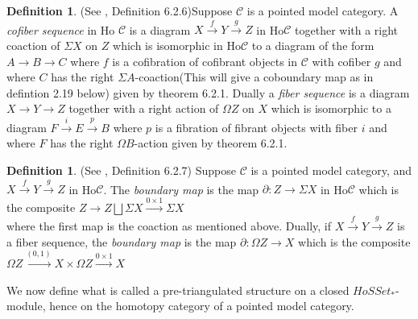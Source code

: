 \documentclass{article}
\newcommand{\cC}{\mathcal{C}}
\theoremstyle{definition}
\newtheorem{definition}[theorem]{Definition}
\theoremstyle{remark}
\begin{document}
\begin{definition}
    (See \cite{MR1650134}, Definition 6.2.6)\label{def:cofseq} Suppose $\cC$ is a pointed model category. A \textit{cofiber sequence} in Ho $\cC$ is a diagram $X \xrightarrow{f} Y \xrightarrow{g} Z$ in Ho$\cC$ together with a right coaction of $\Sigma X$ on $Z$ which is isomorphic in Ho$\cC$ to a diagram of the form $A \rightarrow B \rightarrow C$ where $f$ is a cofibration of cofibrant objects in $\cC$ with cofiber $g$ and where $C$ has the right $\Sigma A$-coaction(This will give a coboundary map as in defintion 2.19 below) given by theorem 6.2.1. Dually a \textit{fiber sequence} is a diagram $X \rightarrow Y \rightarrow Z$ together with a right action of $\Omega Z$ on $X$ which is isomorphic to a diagram $F \xrightarrow{i} E \xrightarrow{p} B$ where $p$ is a fibration of fibrant objects with fiber $i$ and where $F$ has the right $\Omega B$-action given by theorem 6.2.1.
\end{definition}
\begin{definition} \label{def:boundarymap}
    (See \cite{MR1650134}, Definition 6.2.7) Suppose $\cC$ is a pointed model category, and $X \xrightarrow{f} Y \xrightarrow{g} Z$ in Ho$\cC$. The \textit{boundary map} is the map $\partial: Z \rightarrow \Sigma X$ in Ho$\cC$ which is the composite $Z \rightarrow Z\bigsqcup \Sigma X \xrightarrow{0 \times 1} \Sigma X$ \\ where the first map is the coaction as mentioned above. Dually, if $X \xrightarrow{f} Y \xrightarrow{g} Z$ is a fiber sequence, the \textit{boundary map} is the map $\partial :\Omega Z \rightarrow X$ which is the composite $\Omega Z \xrightarrow{(0,1)} X \times \Omega Z \xrightarrow{0 \times 1}  X$
\end{definition}
We now define what is called a pre-triangulated structure on a closed $HoSSet_{*}$-module, hence on the homotopy category of a pointed model category.
\end{document}
